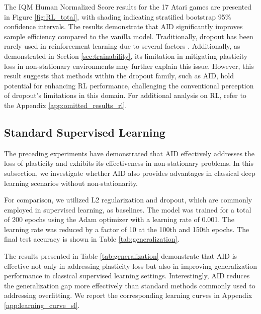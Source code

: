 

The IQM Human Normalized Score results for the 17 Atari games are presented in Figure \ref{fig:RL_total}, with shading indicating stratified bootstrap 95\% confidence intervals.
The results demonstrate that AID significantly improves sample efficiency compared to the vanilla model.
Traditionally, dropout has been rarely used in reinforcement learning due to several factors \cite{hausknecht2022consistent}.
Additionally, as demonstrated in Section \ref{sec:trainability}, its limitation in mitigating plasticity loss in non-stationary environments may further explain this issue.
However, this result suggests that methods within the dropout family, such as AID, hold potential for enhancing RL performance, challenging the conventional perception of dropout's limitations in this domain.
For additional analysis on RL, refer to the Appendix \ref{app:omitted_results_rl}.


\subsection{Standard Supervised Learning}
\label{sec:exp_gen}
The preceding experiments have demonstrated that AID effectively addresses the loss of plasticity and exhibits its effectiveness in non-stationary problems.
In this subsection, we investigate whether AID also provides advantages in classical deep learning scenarios without non-stationarity.

For comparison, we utilized L2 regularization and dropout, which are commonly employed in supervised learning, as baselines.
The model was trained for a total of 200 epochs using the Adam optimizer with a learning rate of 0.001.
The learning rate was reduced by a factor of 10 at the 100th and 150th epochs.
The final test accuracy is shown in Table \ref{tab:generalization}.


The results presented in Table \ref{tab:generalization} demonstrate that AID is effective not only in addressing plasticity loss but also in improving generalization performance in classical supervised learning settings.
Interestingly, AID reduces the generalization gap more effectively than standard methods commonly used to addressing overfitting.
We report the corresponding learning curves in Appendix \ref{app:learning_curve_sl}.



